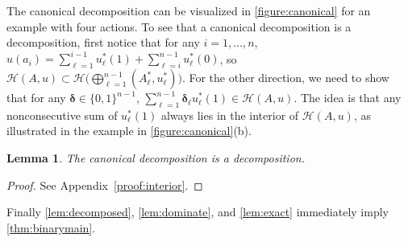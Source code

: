 \documentclass[11pt]{article}
\theoremstyle{plain}
\newtheorem{lem}{Lemma}
\theoremstyle{remark}
\newcommand{\bu}{\mathbf{u}}
\newcommand{\po}{\mathcal{H}}
\begin{document}
\begin{figure}[t]
{   
}
	
	\caption{}
	\label{figure:canonical}
\end{figure}




The canonical decomposition can be visualized in \autoref{figure:canonical} for an example with four actions. To see that a canonical decomposition is a decomposition, first notice that for any $i=1,...,n$, $u(a_i)=\sum_{\ell=1}^{i-1}u^*_{\ell}(1)+\sum_{\ell=i}^{n-1}u^*_{\ell}(0)$, so $\po(A,u)\subset \po\big(\bigoplus_{\ell=1}^{n-1}(A^*_{\ell},u^*_\ell)\big)$. For the other direction, we need to show that for any ${\boldsymbol\delta}\in\{0,1\}^{n-1}$, $\sum_{\ell=1}^{n-1} {\boldsymbol\delta}_\ell u_\ell^*(1)\in \po(A,u)$. The idea is that any nonconsecutive sum of $u_\ell^*(1)$ always lies in the interior of $\po(A,u)$, as illustrated in the example in \autoref{figure:canonical}(b).



\begin{lem}\label{lem:exact}
The canonical decomposition is a decomposition.
\end{lem}

\begin{proof}
See Appendix~\ref{proof:interior}.
\end{proof}

Finally \autoref{lem:decomposed}, \autoref{lem:dominate}, and \autoref{lem:exact} immediately imply \autoref{thm:binarymain}.
\end{document}

